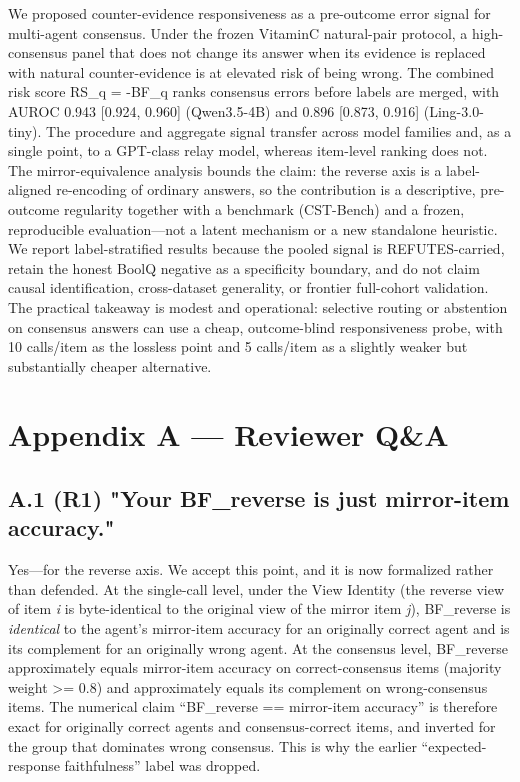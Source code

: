 \documentclass[11pt]{article}
\begin{document}
We proposed counter-evidence responsiveness as a pre-outcome error signal for multi-agent consensus. Under the frozen VitaminC natural-pair protocol, a high-consensus panel that does not change its answer when its evidence is replaced with natural counter-evidence is at elevated risk of being wrong. The combined risk score RS\_q = -BF\_q ranks consensus errors before labels are merged, with AUROC 0.943 [0.924, 0.960] (Qwen3.5-4B) and 0.896 [0.873, 0.916] (Ling-3.0-tiny). The procedure and aggregate signal transfer across model families and, as a single point, to a GPT-class relay model, whereas item-level ranking does not. The mirror-equivalence analysis bounds the claim: the reverse axis is a label-aligned re-encoding of ordinary answers, so the contribution is a descriptive, pre-outcome regularity together with a benchmark (CST-Bench) and a frozen, reproducible evaluation—not a latent mechanism or a new standalone heuristic. We report label-stratified results because the pooled signal is REFUTES-carried, retain the honest BoolQ negative as a specificity boundary, and do not claim causal identification, cross-dataset generality, or frontier full-cohort validation. The practical takeaway is modest and operational: selective routing or abstention on consensus answers can use a cheap, outcome-blind responsiveness probe, with 10 calls/item as the lossless point and 5 calls/item as a slightly weaker but substantially cheaper alternative.

\section{Appendix A — Reviewer Q\&A}

\subsection{A.1 (R1) "Your BF\_reverse is just mirror-item accuracy."}

Yes—for the reverse axis. We accept this point, and it is now formalized rather than defended. At the single-call level, under the View Identity (the reverse view of item \emph{i} is byte-identical to the original view of the mirror item \emph{j}), BF\_reverse is \emph{identical} to the agent's mirror-item accuracy for an originally correct agent and is its complement for an originally wrong agent. At the consensus level, BF\_reverse approximately equals mirror-item accuracy on correct-consensus items (majority weight >= 0.8) and approximately equals its complement on wrong-consensus items. The numerical claim “BF\_reverse == mirror-item accuracy” is therefore exact for originally correct agents and consensus-correct items, and inverted for the group that dominates wrong consensus. This is why the earlier “expected-response faithfulness” label was dropped.
\end{document}
